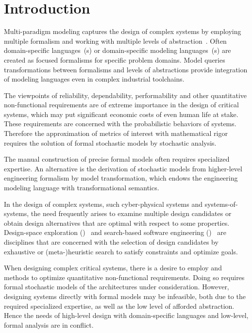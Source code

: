 \chapter{Introduction}
\label{chap:intro}

Multi-paradigm modeling captures the design of complex systems by employing multiple formalism and working with multiple levels of abstraction~\citep{Giese06multiparadigm}. Often domain-specific languages~(s) or domain-specific modeling languages~(s) are created as focused formalisms for specific problem domains. Model queries transformations between formalisms and levels of abstractions provide integration of modeling languages even in complex industrial toolchains.

The viewpoints of reliability, dependability, performability and other quantitative non-functional requirements are of extreme importance in the design of critical systems, which may put significant economic costs of even human life at stake. These requirements are concerned with the probabilistic behaviors of systems. Therefore the approximation of metrics of interest with mathematical rigor requires the solution of formal stochastic models by stochastic analysis.

The manual construction of precise formal models often requires specialized expertise. An alternative is the derivation of stochastic models from higher-level engineering formalism by model transformation, which endows the engineering modeling language with transformational semantics.

In the design of complex systems, such cyber-physical systems and systems-of-systems, the need frequently arises to examine multiple design candidates or obtain design alternatives that are optimal with respect to some properties. Design-space exploration ()~ and search-based software engineering ()~ are disciplines that are concerned with the selection of design candidates by exhaustive or (meta-)heuristic search to satisfy constraints and optimize goals.

When designing complex critical systems, there is a desire to employ  and  methods to optimize quantitative non-functional requirements. Doing so requires formal stochastic models of the architectures under consideration. However, designing systems directly with formal models may be infeasible, both due to the required specialized expertise, as well as the low level of afforded abstraction. Hence the needs of high-level design with domain-specific languages and low-level, formal analysis are in conflict.

